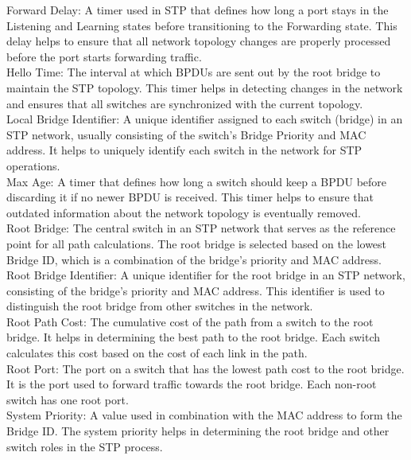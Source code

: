\documentclass{article}
\begin{document}
Forward Delay: A timer used in STP that defines how long a port stays in the Listening and Learning states before transitioning to the Forwarding state. This delay helps to ensure that all network topology changes are properly processed before the port starts forwarding traffic.\\

Hello Time: The interval at which BPDUs are sent out by the root bridge to maintain the STP topology. This timer helps in detecting changes in the network and ensures that all switches are synchronized with the current topology.\\

Local Bridge Identifier: A unique identifier assigned to each switch (bridge) in an STP network, usually consisting of the switch's Bridge Priority and MAC address. It helps to uniquely identify each switch in the network for STP operations.\\

Max Age: A timer that defines how long a switch should keep a BPDU before discarding it if no newer BPDU is received. This timer helps to ensure that outdated information about the network topology is eventually removed.\\

Root Bridge: The central switch in an STP network that serves as the reference point for all path calculations. The root bridge is selected based on the lowest Bridge ID, which is a combination of the bridge’s priority and MAC address.\\

Root Bridge Identifier: A unique identifier for the root bridge in an STP network, consisting of the bridge’s priority and MAC address. This identifier is used to distinguish the root bridge from other switches in the network.\\

Root Path Cost: The cumulative cost of the path from a switch to the root bridge. It helps in determining the best path to the root bridge. Each switch calculates this cost based on the cost of each link in the path.\\

Root Port: The port on a switch that has the lowest path cost to the root bridge. It is the port used to forward traffic towards the root bridge. Each non-root switch has one root port.\\

System Priority: A value used in combination with the MAC address to form the Bridge ID. The system priority helps in determining the root bridge and other switch roles in the STP process.\\
\end{document}
